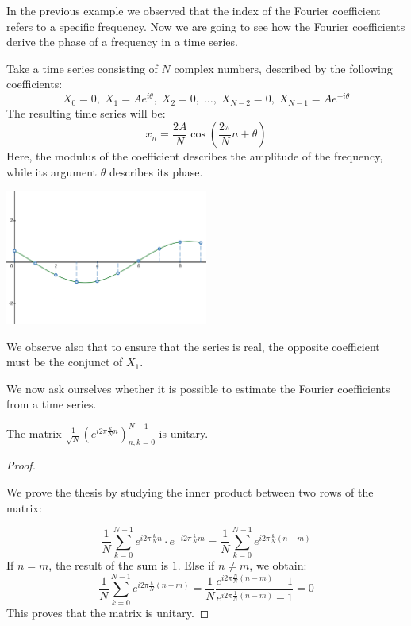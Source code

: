 \begin{exempli_gratia}[Phase]
	\begin{toReview}
		In the previous example we observed that the index of the Fourier coefficient refers to a specific frequency. Now we are going to see how the Fourier coefficients derive the phase of a frequency in a time series.
	\end{toReview}

	\noindent Take a time series consisting of $N$ complex numbers, described by the following coefficients:
	\[
		X_0=0,\;X_1=Ae^{i\theta},\;X_2=0,\;\dots,\;X_{N-2}=0,\;X_{N-1}=Ae^{-i\theta}
	\]
	The resulting time series will be:
    \[
		x_n = \frac{2A}{N}\cos\left(\frac{2\pi}{N}n + \theta\right)
	\]
	Here, the modulus of the coefficient describes the amplitude of the frequency, while its argument $\theta$ describes its phase.
	\begin{center}
		\centering
		\includegraphics[width=0.5\textwidth]{Figures/fftexample3.png}
	\end{center}

	\begin{modified}
		\noindent We observe also that to ensure that the series is real, the opposite coefficient must be the conjunct of $X_1$.
	\end{modified}
\end{exempli_gratia}

\bigskip
We now ask ourselves whether it is possible to estimate the Fourier coefficients from a time series.
\begin{proposition} \label{prop:dft_unitaria}
	The matrix $\frac{1}{\sqrt{N}}\left(e^{i2\pi\frac{k}{N}n}\right)_{n,k=0}^{N-1}$ is unitary.
	\begin{proof}
		\begin{modified} We prove the thesis by studying the inner product between two rows of the matrix: \end{modified}
		\[
		\frac{1}{N}\sum_{k=0}^{N-1} e^{i2\pi\frac{k}{N}n}\cdot e^{-i2\pi\frac{k}{N}m} = \frac{1}{N}\sum_{k=0}^{N-1} e^{i2\pi\frac{k}{N}(n-m)}
		\]
		If $n = m$, the result of the sum is $1$. Else if $n \neq m$, we obtain:
		\[
			\frac{1}{N}\sum_{k=0}^{N-1} e^{i2\pi\frac{k}{N}(n-m)} = \frac{1}{N}\frac{e^{i2\pi\frac{N}{N}(n-m)}-1}{e^{i2\pi\frac{1}{N}(n-m)}-1} = 0
		\]
		This proves that the matrix is unitary.
	\end{proof}
\end{proposition}

